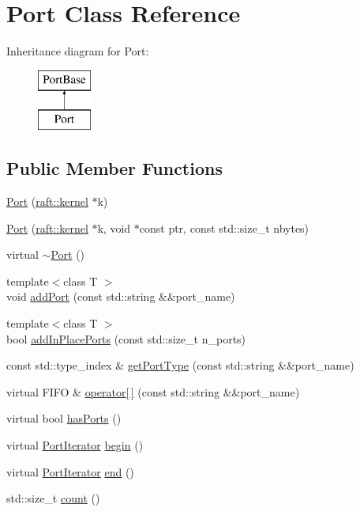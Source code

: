 \hypertarget{class_port}{}\section{Port Class Reference}
\label{class_port}
Inheritance diagram for Port\+:\begin{figure}[H]
\begin{center}
\leavevmode
\includegraphics[height=2.000000cm]{class_port}
\end{center}
\end{figure}
\subsection*{Public Member Functions}
\begin{DoxyCompactItemize}
\item 
\hyperlink{class_port_ac7da4ae14a771d5509e743e98fe0dc05}{Port} (\hyperlink{classraft_1_1kernel}{raft\+::kernel} $\ast$k)
\item 
\hyperlink{class_port_a706968dde40372ffd1748d50c258f6b7}{Port} (\hyperlink{classraft_1_1kernel}{raft\+::kernel} $\ast$k, void $\ast$const ptr, const std\+::size\+\_\+t nbytes)
\item 
virtual \hyperlink{class_port_afe166c2a6b10ad34d47472a150366bc1}{$\sim$\+Port} ()
\item 
{\footnotesize template$<$class T $>$ }\\void \hyperlink{class_port_aeb1c43cc7563ce977ba0bc7b581d2e75}{add\+Port} (const std\+::string \&\&port\+\_\+name)
\item 
{\footnotesize template$<$class T $>$ }\\bool \hyperlink{class_port_aaf89e298b9ae64f9c42703c14d9eed0a}{add\+In\+Place\+Ports} (const std\+::size\+\_\+t n\+\_\+ports)
\item 
const std\+::type\+\_\+index \& \hyperlink{class_port_af34969d8f5e17ad29233334526d5b77b}{get\+Port\+Type} (const std\+::string \&\&port\+\_\+name)
\item 
virtual F\+I\+F\+O \& \hyperlink{class_port_a08cf165426982d83e5a191ba74cc6e5d}{operator\mbox{[}$\,$\mbox{]}} (const std\+::string \&\&port\+\_\+name)
\item 
virtual bool \hyperlink{class_port_a7042f5b5c2ab14c9591a4984811a6012}{has\+Ports} ()
\item 
virtual \hyperlink{class_port_iterator}{Port\+Iterator} \hyperlink{class_port_abf4d86026b67f6c02db3e3abb0f2e8b4}{begin} ()
\item 
virtual \hyperlink{class_port_iterator}{Port\+Iterator} \hyperlink{class_port_aa85be3fb7734863d482bf002e0f0923d}{end} ()
\item 
std\+::size\+\_\+t \hyperlink{class_port_a33562ea87ac7e83a32441da40cbd9279}{count} ()
\end{DoxyCompactItemize}
